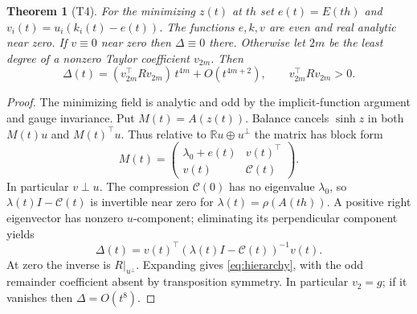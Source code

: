 \documentclass[11pt]{article}
\newtheorem{theorem}{Theorem}
\newcommand{\R}{\mathbb R}
\begin{document}
\begin{theorem}[T4]
For the minimizing \(z(t)\) at \(th\) set \(e(t)=E(th)\) and
\(v_i(t)=u_i(k_i(t)-e(t))\). The functions \(e,k,v\) are even and
real analytic near zero. If \(v\equiv0\) near zero then \(\Delta\equiv0\)
there. Otherwise let \(2m\) be the least degree of a nonzero Taylor
coefficient \(v_{2m}\). Then
\begin{equation}
 \Delta(t)=(v_{2m}^{\top}R v_{2m})\,t^{4m}+O(t^{4m+2}),
 \qquad v_{2m}^{\top}R v_{2m}>0 .
 \label{eq:hierarchy}
\end{equation}
\end{theorem}
\begin{proof}
The minimizing field is analytic and odd by the implicit-function
argument and gauge invariance. Put \(M(t)=A(z(t))\). Balance cancels
\(\sinh z\) in both \(M(t)u\) and \(M(t)^\top u\). Thus relative to
\(\R u\oplus u^\perp\) the matrix has block form
\[
 M(t)=\begin{pmatrix}\lambda_0+e(t)&v(t)^\top\\ v(t)&\mathcal C(t)\end{pmatrix}.
\]
In particular \(v\perp u\). The compression \(\mathcal C(0)\) has no
eigenvalue \(\lambda_0\), so \(\lambda(t)I-\mathcal C(t)\) is invertible
near zero for \(\lambda(t)=\rho(A(th))\). A positive right eigenvector
has nonzero \(u\)-component; eliminating its perpendicular component yields
\[
 \Delta(t)=v(t)^\top(\lambda(t)I-\mathcal C(t))^{-1}v(t).
\]
At zero the inverse is \(R|_{u^\perp}\). Expanding gives
\eqref{eq:hierarchy}, with the odd remainder coefficient absent by
transposition symmetry. In particular \(v_2=g\); if it vanishes
then \(\Delta=O(t^8)\).
\end{proof}
\end{document}
